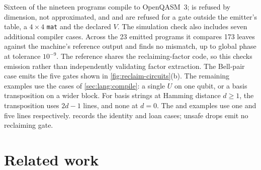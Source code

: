 \documentclass[acmsmall,screen,review,anonymous,nonacm]{acmart}
\begin{document}
Sixteen of the nineteen programs compile to OpenQASM~3; 
is refused by dimension, not approximated, and  and
 are refused for a gate outside the emitter's table, a $4 \times
4$ \texttt{mat} and the declared $V$. The simulation check also includes
seven additional compiler cases. Across the 23 emitted programs it compares
173 leaves against the machine's reference output and finds no mismatch,
up to global phase at tolerance $10^{-9}$. The reference shares the
reclaiming-factor code, so this checks emission rather than independently
validating factor extraction. The Bell-pair case emits the five gates shown in
\cref{fig:reclaim-circuits}(b).
The remaining examples use the cases of \cref{sec:lang:compile}:
a single $U$ on one qubit, or a basis transposition on a wider block.
For basis strings at Hamming distance $d\ge1$, the transposition uses
$2d-1$ lines, and none at $d=0$. The  and 
examples use one and five lines respectively.
 records the identity and loan cases; unsafe drops
emit no reclaiming gate.

\section{Related work}\label{sec:related}
\end{document}
